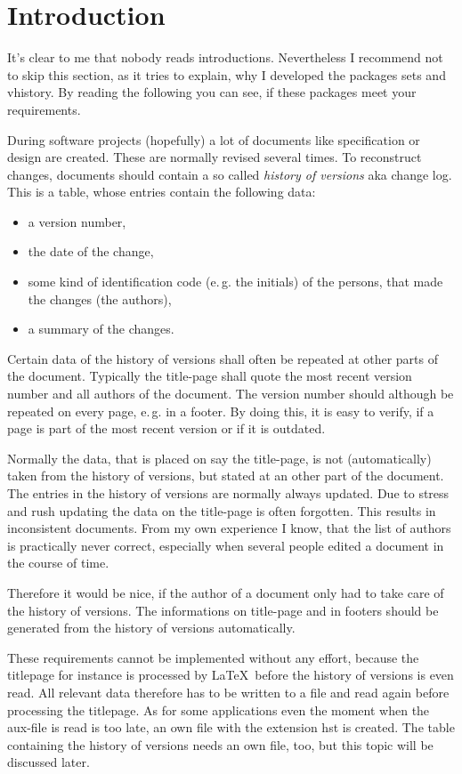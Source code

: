 \section{Introduction}\label{introduction}
It's clear to me that nobody reads introductions. Nevertheless I recommend not to skip this section, as it tries to explain, why I developed the packages sets and vhistory.
By reading the following you can see, if these packages meet your requirements.

During software projects (hopefully) a lot of documents like specification or design are created. These are normally revised several times. To reconstruct changes, documents should contain a so called \emph{history of versions} aka change log. This is a table, whose entries contain the following data:
\begin{itemize}
	\item a version number,
	\item the date of the change,
	\item some kind of identification code (e.\,g. the initials) of the persons, that
	made the changes (the authors),
	\item a summary of the changes.
\end{itemize}

Certain data of the history of versions shall often be repeated at other parts of the document. Typically the title-page shall quote the most recent version number and all authors of the document. The version number should although be repeated on every page, e.\,g. in a footer. By doing this, it is easy to verify, if a page is part of the most recent version or if it is outdated.

Normally the data, that is placed on say the title-page, is not (automatically) taken from the history of versions, but stated at an other part of the document. The entries in the history of versions are normally always updated. Due to stress and rush updating the data on the title-page is often forgotten. This results in inconsistent documents.
From my own experience I know, that the list of authors is practically never correct, especially when several people edited a document in the course of time.

Therefore it would be nice, if the author of a document only had to take care of the history of versions. The informations on title-page and in footers should be generated from the history of versions automatically.

These requirements cannot be implemented without any effort, because the titlepage for instance is processed by \LaTeX\ before the history of versions is even read. 
All relevant data therefore has to be written to a file and read again before processing the titlepage. As for some applications even the moment when the aux-file is read is too late, an own file with the extension hst is created.
The table containing the history of versions needs an own file, too, but this topic will be discussed later.


